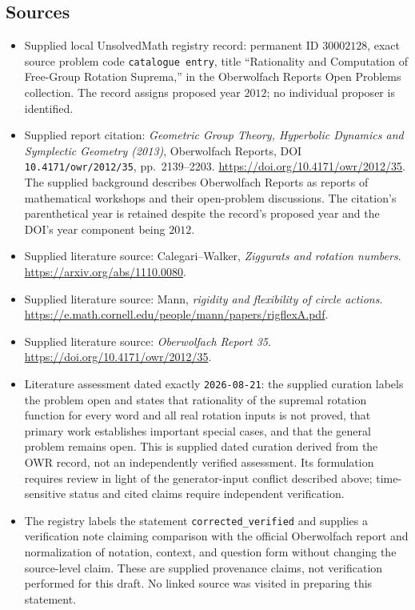\documentclass[11pt]{article}
\begin{document}
\subsection{Sources}
\begin{itemize}
\item Supplied local UnsolvedMath registry record: permanent ID \(30002128\), exact source problem code \texttt{catalogue entry}, title ``Rationality and Computation of Free-Group Rotation Suprema,'' in the Oberwolfach Reports Open Problems collection. The record assigns proposed year \(2012\); no individual proposer is identified.
\item Supplied report citation: \emph{Geometric Group Theory, Hyperbolic Dynamics and Symplectic Geometry (2013)}, Oberwolfach Reports, DOI \texttt{10.4171/owr/2012/35}, pp.\ 2139--2203. \url{https://doi.org/10.4171/owr/2012/35}. The supplied background describes Oberwolfach Reports as reports of mathematical workshops and their open-problem discussions. The citation's parenthetical year is retained despite the record's proposed year and the DOI's year component being \(2012\).
\item Supplied literature source: Calegari--Walker, \emph{Ziggurats and rotation numbers}. \url{https://arxiv.org/abs/1110.0080}.
\item Supplied literature source: Mann, \emph{rigidity and flexibility of circle actions}. \url{https://e.math.cornell.edu/people/mann/papers/rigflexA.pdf}.
\item Supplied literature source: \emph{Oberwolfach Report 35}. \url{https://doi.org/10.4171/owr/2012/35}.
\item Literature assessment dated exactly \texttt{2026-08-21}: the supplied curation labels the problem open and states that rationality of the supremal rotation function for every word and all real rotation inputs is not proved, that primary work establishes important special cases, and that the general problem remains open. This is supplied dated curation derived from the OWR record, not an independently verified assessment. Its formulation requires review in light of the generator-input conflict described above; time-sensitive status and cited claims require independent verification.
\item The registry labels the statement \texttt{corrected\_verified} and supplies a verification note claiming comparison with the official Oberwolfach report and normalization of notation, context, and question form without changing the source-level claim. These are supplied provenance claims, not verification performed for this draft. No linked source was visited in preparing this statement.
\end{itemize}
\end{document}
